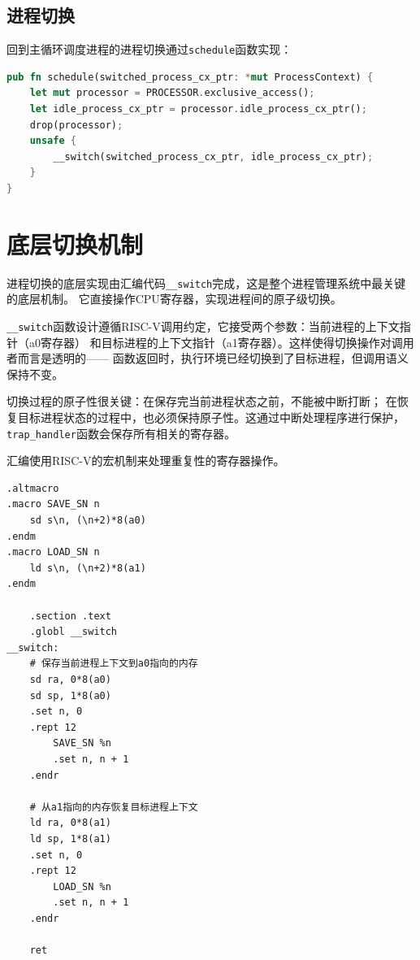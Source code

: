 \subsection{进程切换}

回到主循环调度进程的进程切换通过\lstinline[language=Rust]{schedule}函数实现：

\begin{lstlisting}[language=Rust,caption={进程切换实现}, label={lst:process-switch}]
pub fn schedule(switched_process_cx_ptr: *mut ProcessContext) {
    let mut processor = PROCESSOR.exclusive_access();
    let idle_process_cx_ptr = processor.idle_process_cx_ptr();
    drop(processor);
    unsafe {
        __switch(switched_process_cx_ptr, idle_process_cx_ptr);
    }
}
\end{lstlisting}

\section{底层切换机制}

进程切换的底层实现由汇编代码\lstinline[language=Rust]{__switch}完成，这是整个进程管理系统中最关键的底层机制。
它直接操作CPU寄存器，实现进程间的原子级切换。

\lstinline[language=Rust]{__switch}函数设计遵循RISC-V调用约定，它接受两个参数：当前进程的上下文指针（a0寄存器）
和目标进程的上下文指针（a1寄存器）。这样使得切换操作对调用者而言是透明的——
函数返回时，执行环境已经切换到了目标进程，但调用语义保持不变。

切换过程的原子性很关键：在保存完当前进程状态之前，不能被中断打断；
在恢复目标进程状态的过程中，也必须保持原子性。这通过中断处理程序进行保护，
\lstinline[language=Rust]{trap_handler}函数会保存所有相关的寄存器。

汇编使用RISC-V的宏机制来处理重复性的寄存器操作。

\begin{lstlisting}[language={[x86masm]Assembler},caption={底层上下文切换}, label={lst:low-level-switch}]
.altmacro
.macro SAVE_SN n
    sd s\n, (\n+2)*8(a0)
.endm
.macro LOAD_SN n
    ld s\n, (\n+2)*8(a1)
.endm

    .section .text
    .globl __switch
__switch:
    # 保存当前进程上下文到a0指向的内存
    sd ra, 0*8(a0)
    sd sp, 1*8(a0)
    .set n, 0
    .rept 12
        SAVE_SN %n
        .set n, n + 1
    .endr

    # 从a1指向的内存恢复目标进程上下文
    ld ra, 0*8(a1)
    ld sp, 1*8(a1)
    .set n, 0
    .rept 12
        LOAD_SN %n
        .set n, n + 1
    .endr

    ret
\end{lstlisting}

